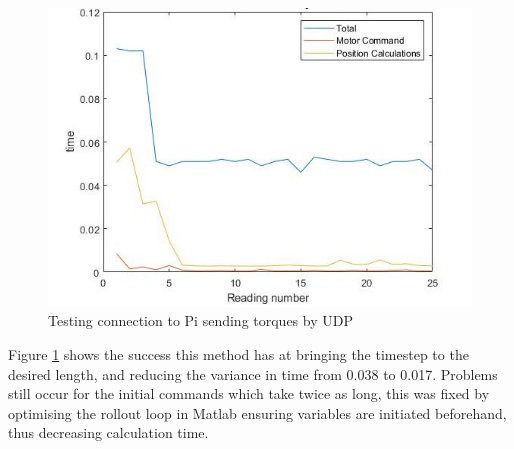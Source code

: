 \documentclass[twoside,twocolumn,12pt]{article}
\begin{document}
\begin{figure}
  \centering
    \includegraphics[width=\linewidth]{50ms_udp}
  \caption{Testing connection to Pi sending torques by UDP}
  \label{fig:piudp}
\end{figure} 

Figure \ref{fig:piudp} shows the success this method has at bringing the timestep to the desired length, and reducing the variance in time from 0.038 to 0.017.  Problems still occur for the initial commands which take twice as long, this was fixed by optimising the rollout loop in Matlab ensuring variables are initiated beforehand, thus decreasing calculation time.  

\onecolumn
\end{document}
